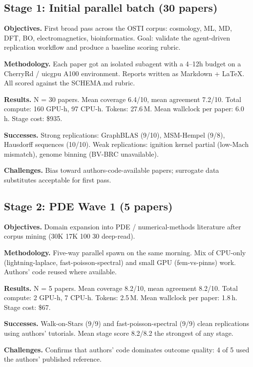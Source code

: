 \documentclass[11pt,letterpaper]{article}
\begin{document}
\subsection{Stage 1: Initial parallel batch (30 papers)}

\textbf{Objectives.} First broad pass across the OSTI corpus: cosmology, ML, MD, DFT, BO, electromagnetics, bioinformatics. Goal: validate the agent-driven replication workflow and produce a baseline scoring rubric.

\textbf{Methodology.} Each paper got an isolated subagent with a 4--12h budget on a CherryRd / uicgpu A100 environment. Reports written as Markdown + LaTeX. All scored against the SCHEMA.md rubric.

\textbf{Results.} N = 30 papers. Mean coverage 6.4/10, mean agreement 7.2/10. Total compute: 160 GPU-h, 97 CPU-h. Tokens: 27.6\,M. Mean wallclock per paper: 6.0\,h. Stage cost: \$935.

\textbf{Successes.} Strong replications: GraphBLAS (9/10), MSM-Hempel (9/8), Hausdorff sequences (10/10). Weak replications: ignition kernel partial (low-Mach mismatch), genome binning (BV-BRC unavailable).

\textbf{Challenges.} Bias toward authors-code-available papers; surrogate data substitutes acceptable for first pass.

\subsection{Stage 2: PDE Wave 1 (5 papers)}

\textbf{Objectives.} Domain expansion into PDE / numerical-methods literature after corpus mining (30K \textrightarrow{} 17K \textrightarrow{} 100 \textrightarrow{} 30 deep-read).

\textbf{Methodology.} Five-way parallel spawn on the same morning. Mix of CPU-only (lightning-laplace, fast-poisson-spectral) and small GPU (fem-vs-pinns) work. Authors' code reused where available.

\textbf{Results.} N = 5 papers. Mean coverage 8.2/10, mean agreement 8.2/10. Total compute: 2 GPU-h, 7 CPU-h. Tokens: 2.5\,M. Mean wallclock per paper: 1.8\,h. Stage cost: \$67.

\textbf{Successes.} Walk-on-Stars (9/9) and fast-poisson-spectral (9/9) clean replications using authors' tutorials. Mean stage score 8.2/8.2 \textemdash the strongest of any stage.

\textbf{Challenges.} Confirms that authors' code dominates outcome quality: 4 of 5 used the authors' published reference.
\end{document}
